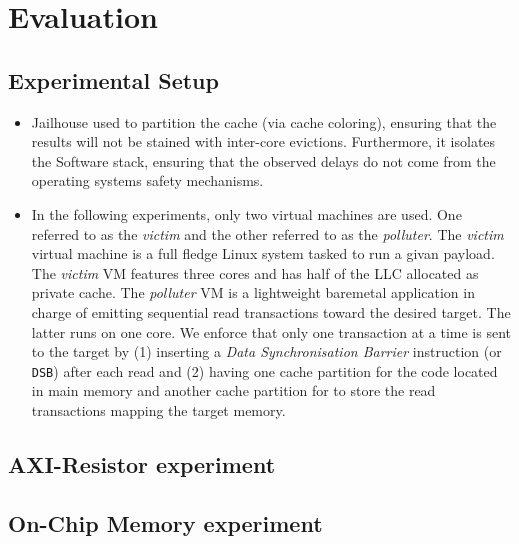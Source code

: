 \section{Evaluation}
    \subsection{Experimental Setup}
        \begin{itemize}
            \item Jailhouse used to partition the cache (via cache coloring), ensuring that the results will not be stained with inter-core evictions. Furthermore, it isolates the Software stack, ensuring that the observed delays do not come from the operating systems safety mechanisms.
            \item In the following experiments, only two virtual machines are used. One referred to as the \emph{victim} and the other referred to as the \emph{polluter}. The \emph{victim} virtual machine is a full fledge Linux system tasked to run a givan payload. The \emph{victim} VM features three cores and has half of the LLC allocated as private cache. The \emph{polluter} VM is a lightweight baremetal application in charge of emitting sequential read transactions toward the desired target. The latter runs on one core. We enforce that only one transaction at a time is sent to the target by (1) inserting a \emph{Data Synchronisation Barrier} instruction (or \texttt{DSB}) after each read and (2) having one cache partition for the code located in main memory and another cache partition for to store the read transactions mapping the target memory.
        \end{itemize}

    \subsection{AXI-Resistor experiment}

    \subsection{On-Chip Memory experiment}
